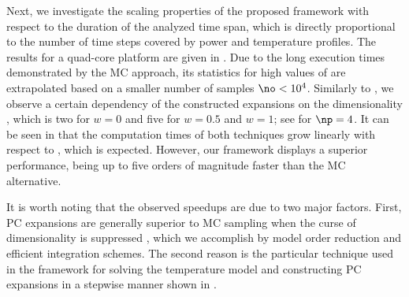 Next, we investigate the scaling properties of the proposed framework with
respect to the duration of the analyzed time span, which is directly
proportional to the number of time steps \ns covered by power and temperature
profiles. The results for a quad-core platform are given in
. Due to the long execution times demonstrated
by the \ac{MC} approach, its statistics for high values of \ns are extrapolated
based on a smaller number of samples $\no < 10^4$. Similarly to
, we observe a certain dependency of the
constructed expansions on the dimensionality \nz, which is two for $w = 0$ and
five for $w = 0.5$ and $w = 1$; see  for
$\np = 4$. It can be seen in  that the
computation times of both techniques grow linearly with respect to \ns, which is
expected. However, our framework displays a superior performance, being up to
five orders of magnitude faster than the \ac{MC} alternative.

It is worth noting that the observed speedups are due to two major factors.
First, \ac{PC} expansions are generally superior to \ac{MC} sampling when the
curse of dimensionality is suppressed \cite{eldred2008, xiu2010}, which we
accomplish by model order reduction and efficient integration schemes. The
second reason is the particular technique used in the framework for solving the
temperature model and constructing \ac{PC} expansions in a stepwise manner shown
in .
